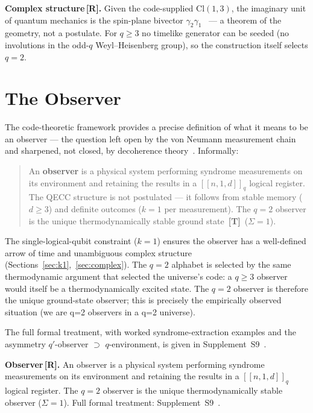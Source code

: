 \documentclass[11pt,a4paper]{article}
\newcommand{\Rmark}{\textcolor{green!50!black}{\textbf{[R]}}}
\newcommand{\Tmark}{\textcolor{orange!70!black}{\textbf{[T]}}}
\newcommand{\Cq}[4]{[\![#1,#2,#3]\!]_{#4}}
\providecommand{\Cl}[1]{\mathrm{Cl}(#1)}
\begin{document}
\begin{mdframed}[backgroundcolor=Rbg,linecolor=Rcolor,linewidth=1.5pt]
\textbf{Complex structure\,\Rmark.}\quad
Given the code-supplied $\Cl{1,3}$, the imaginary unit of quantum mechanics is the spin-plane bivector $\gamma_2\gamma_1$~\cite{Hubka2026CW} --- a theorem of the geometry, not a postulate. For $q\geq3$ no timelike generator can be seeded (no involutions in the odd-$q$ Weyl--Heisenberg group), so the construction itself selects $q=2$.
\end{mdframed}

\newpage

\section{The Observer}
\label{sec:observer}

The code-theoretic framework provides a precise definition of what it means to be an observer --- the question left open by the von Neumann measurement chain~\cite{vNeumannQM} and sharpened, not closed, by decoherence theory~\cite{Zurek2003}. Informally:
\begin{quote}
An \textbf{observer} is a physical system performing syndrome measurements on its environment and retaining the results in a $\Cq{n}{1}{d}{q}$ logical register. The QECC structure is not postulated --- it follows from stable memory ($d\geq3$) and definite outcomes ($k=1$ per measurement). The $q=2$ observer is the unique thermodynamically stable ground state~\Tmark\ ($\Sigma=1$).
\end{quote}
The single-logical-qubit constraint ($k=1$) ensures the observer has a well-defined arrow of time and unambiguous complex structure (Sections~\ref{sec:k1},~\ref{sec:complex}). The $q=2$ alphabet is selected by the same thermodynamic argument that selected the universe's code: a $q\geq3$ observer would itself be a thermodynamically excited state. The $q=2$ observer is therefore the unique ground-state observer; this is precisely the empirically observed situation (we are q=2 observers in a q=2 universe).

The full formal treatment, with worked syndrome-extraction examples and the asymmetry $q'$-observer $\supset$ $q$-environment, is given in Supplement~S9~\cite{Hubka2026QSDSupp}.

\begin{mdframed}[backgroundcolor=Rbg,linecolor=Rcolor,linewidth=1.5pt]
\textbf{Observer\,\Rmark.}\quad
An observer is a physical system performing syndrome measurements on its environment and retaining the results in a $\Cq{n}{1}{d}{q}$ logical register. The $q=2$ observer is the unique thermodynamically stable observer ($\Sigma=1$). Full formal treatment: Supplement~S9~\cite{Hubka2026QSDSupp}.
\end{mdframed}
\end{document}
